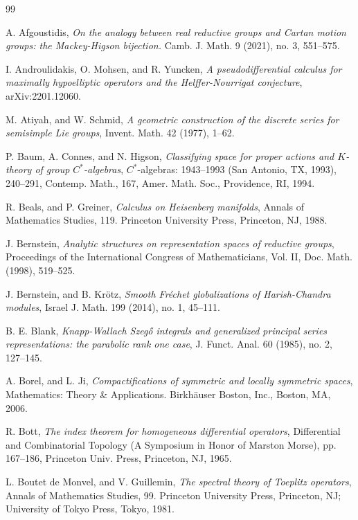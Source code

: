 \documentclass[a4paper,reqno]{amsart}
\numberwithin{equation}{section}
\theoremstyle{definition}
\theoremstyle{remark}
\begin{document}
\begin{thebibliography}{99}

 A. Afgoustidis, \emph{On the analogy between real reductive groups and Cartan motion groups: the Mackey-Higson bijection.} Camb. J. Math. 9 (2021), no. 3, 551--575.

 I. Androulidakis, O. Mohsen, and R. Yuncken, \emph{A pseudodifferential calculus for maximally hypoelliptic operators and the Helffer-Nourrigat conjecture}, arXiv:2201.12060.

 M. Atiyah, and W. Schmid, \emph{A geometric construction of the discrete series for semisimple Lie groups}, Invent. Math. 42 (1977), 1--62.

 P. Baum, A. Connes, and N. Higson, \emph{Classifying space for proper actions and $K$-theory of group $C^\ast$-algebras}, $C^\ast$-algebras: 1943–1993 (San Antonio, TX, 1993), 240--291, Contemp. Math., 167, Amer. Math. Soc., Providence, RI, 1994.

 R. Beals, and P. Greiner, \emph{Calculus on Heisenberg manifolds}, Annals of Mathematics Studies, 119. Princeton University Press, Princeton, NJ, 1988.

 J. Bernstein, \emph{Analytic structures on representation spaces of reductive groups}, Proceedings of the International Congress of Mathematicians, Vol. II, Doc. Math. (1998), 519--525.

 J. Bernstein, and B. Krötz, \emph{Smooth Fréchet globalizations of Harish-Chandra modules}, Israel J. Math. 199 (2014), no. 1, 45--111.

 B. E. Blank, \emph{Knapp-Wallach Szegő integrals and generalized principal series representations: the parabolic rank one case}, J. Funct. Anal. 60 (1985), no. 2, 127--145. 

 A. Borel, and L. Ji, \emph{Compactifications of symmetric and locally symmetric spaces}, Mathematics: Theory \& Applications. Birkhäuser Boston, Inc., Boston, MA, 2006. 


 R. Bott, \emph{The index theorem for homogeneous differential operators}, Differential and Combinatorial Topology (A Symposium in Honor of Marston Morse), pp. 167--186, Princeton Univ. Press, Princeton, NJ, 1965.

 L. Boutet de Monvel, and V. Guillemin, \emph{The spectral theory of Toeplitz operators}, Annals of Mathematics Studies, 99. Princeton University Press, Princeton, NJ; University of Tokyo Press, Tokyo, 1981. 


\end{thebibliography}
\end{document}
